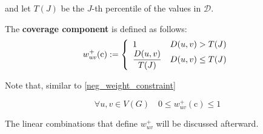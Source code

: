 and let $T(J)$ be the $J$-th percentile of the values in $\mathscr{D}$.

\begin{definition} \label{co_comp}
    The \textbf{coverage component} is defined as follows: $$w_{uv}^+(\mathrm c) := \soe{ll}{1 & D(u, v) > T(J) \\ \dfrac{D(u, v)}{T(J)} & D(u, v) \le T(J)}$$
\end{definition}

Note that, similar to \cref{neg_weight_constraint}

\begin{equation}
    \forall u, v \in V(G) \quad 0 \le w_{uv}^+(\mathrm c) \le 1
\end{equation}

The linear combinations that define $w_{uv}^+$ will be discussed afterward.

\cleardoublepage
